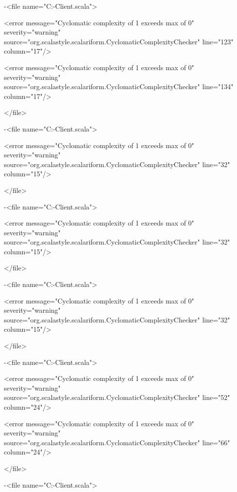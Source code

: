 \documentclass{scalatekids-article}
\begin{document}
-<file name="C:\Users\Davide\Documents\GitHub\Actorbase-Client\src\main\scala\com\actorbase\driver\client\api\RestMethods.scala">

<error message="Cyclomatic complexity of 1 exceeds max of 0" severity="warning" source="org.scalastyle.scalariform.CyclomaticComplexityChecker" line="123" column="17"/>

<error message="Cyclomatic complexity of 1 exceeds max of 0" severity="warning" source="org.scalastyle.scalariform.CyclomaticComplexityChecker" line="134" column="17"/>

</file>


-<file name="C:\Users\Davide\Documents\GitHub\Actorbase-Client\src\main\scala\com\actorbase\cli\models\InsertItemCommand.scala">

<error message="Cyclomatic complexity of 1 exceeds max of 0" severity="warning" source="org.scalastyle.scalariform.CyclomaticComplexityChecker" line="32" column="15"/>

</file>


-<file name="C:\Users\Davide\Documents\GitHub\Actorbase-Client\src\main\scala\com\actorbase\cli\models\LoginCommand.scala">

<error message="Cyclomatic complexity of 1 exceeds max of 0" severity="warning" source="org.scalastyle.scalariform.CyclomaticComplexityChecker" line="32" column="15"/>

</file>


-<file name="C:\Users\Davide\Documents\GitHub\Actorbase-Client\src\main\scala\com\actorbase\cli\models\AddUserCommand.scala">

<error message="Cyclomatic complexity of 1 exceeds max of 0" severity="warning" source="org.scalastyle.scalariform.CyclomaticComplexityChecker" line="32" column="15"/>

</file>


-<file name="C:\Users\Davide\Documents\GitHub\Actorbase-Client\src\main\scala\com\actorbase\driver\client\SSLClient.scala">

<error message="Cyclomatic complexity of 1 exceeds max of 0" severity="warning" source="org.scalastyle.scalariform.CyclomaticComplexityChecker" line="52" column="24"/>

<error message="Cyclomatic complexity of 1 exceeds max of 0" severity="warning" source="org.scalastyle.scalariform.CyclomaticComplexityChecker" line="66" column="24"/>

</file>


-<file name="C:\Users\Davide\Documents\GitHub\Actorbase-Client\src\main\scala\com\actorbase\driver\client\api\RequestBuilder.scala">
\end{document}
